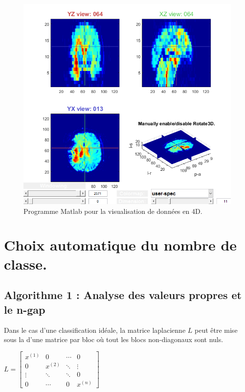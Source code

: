 \begin{figure}[H]
\centering
    \includegraphics[scale=0.8,angle=0]{Images/4D.png}
    \caption{Programme Matlab pour la visualisation de données en 4D.}
    \label{fig:4D}
\end{figure}

\chapter{Choix automatique du nombre de classe.}

\section*{Algorithme 1 : Analyse des valeurs propres et le n-gap}

Dans le cas d'une classification idéale, la matrice laplacienne $L$ peut être mise sous la d'une matrice par bloc où tout les blocs non-diagonaux sont nuls.

\medskip

$
L = 
\begin{bmatrix}
   x^{(1)} &0 &\cdots &0 \\
   0 &x^{(2)} &\ddots &\vdots\\
   \vdots &\ddots &\ddots &0\\
   0 &\cdots &0 &x^{(n)}
\end{bmatrix}
$

